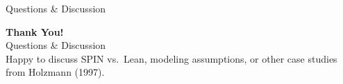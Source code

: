 \documentclass[aspectratio=169]{beamer}
\begin{document}
\begin{frame}[label=qa]{Questions \& Discussion}
  \vspace{1.2em}
  \begin{center}
    {\Huge\bfseries\textcolor{spinNavy}{Thank You!}}\\[0.8em]
    {\Large\textcolor{spinTeal}{Questions \& Discussion}}\\[1.4em]
    {\small\textcolor{spinGray}{Happy to discuss SPIN vs.\ Lean, modeling assumptions, or other case studies from Holzmann (1997).}}
  \end{center}
  \vspace{2.2em}
  \begin{center}
    \hyperlink{backup1}{}\quad
    \hyperlink{backup2}{}\quad
    \hyperlink{backup3}{}
  \end{center}
\end{frame}

\appendix
\end{document}
